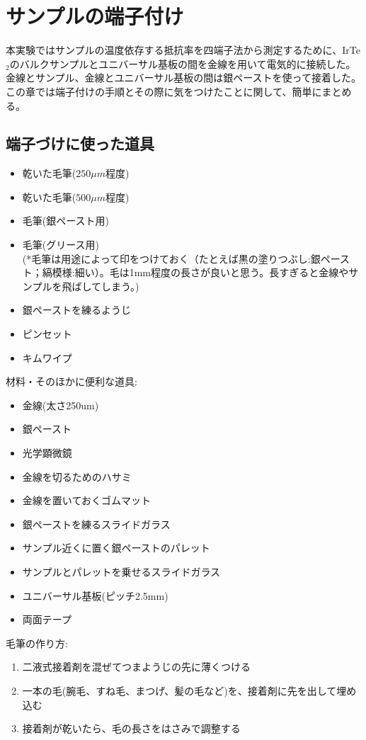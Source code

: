 
\section{サンプルの端子付け}
\label{sec:4terminal}
本実験ではサンプルの温度依存する抵抗率を四端子法から測定するために、IrTe$_2$のバルクサンプルとユニバーサル基板の間を金線を用いて電気的に接続した。金線とサンプル、金線とユニバーサル基板の間は銀ペーストを使って接着した。この章では端子付けの手順とその際に気をつけたことに関して、簡単にまとめる。

\subsection{端子づけに使った道具}

\begin{itemize}
\item 乾いた毛筆($250\mu m$程度)
\item 乾いた毛筆($500\mu m$程度)
\item 毛筆(銀ペースト用)
\item 毛筆(グリース用)\\
(*毛筆は用途によって印をつけておく（たとえば黒の塗りつぶし:銀ペースト；縞模様:細い）。毛は1mm程度の長さが良いと思う。長すぎると金線やサンプルを飛ばしてしまう。)
\item 銀ペーストを練るようじ
\item ピンセット
\item キムワイプ
\end{itemize}

材料・そのほかに便利な道具:
\begin{itemize}
\item 金線(太さ250um)
\item 銀ペースト
\item 光学顕微鏡
\item 金線を切るためのハサミ
\item 金線を置いておくゴムマット
\item 銀ペーストを練るスライドガラス
\item サンプル近くに置く銀ペーストのパレット
\item サンプルとパレットを乗せるスライドガラス
\item ユニバーサル基板(ピッチ2.5mm)
\item 両面テープ
\end{itemize}

毛筆の作り方:
\begin{enumerate}
\item 二液式接着剤を混ぜてつまようじの先に薄くつける
\item 一本の毛(腕毛、すね毛、まつげ、髪の毛など)を、接着剤に先を出して埋め込む
\item  接着剤が乾いたら、毛の長さをはさみで調整する
 \end{enumerate}

